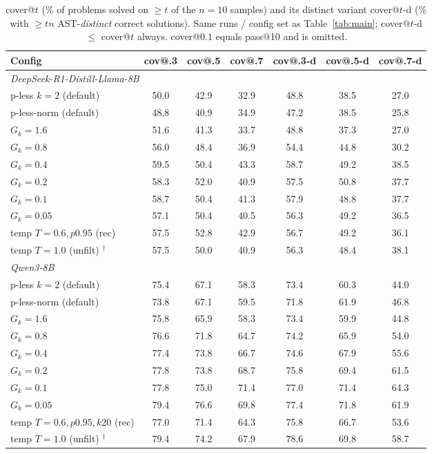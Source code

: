 \documentclass[11pt]{article}                       %
\begin{document}
\begin{table}[H]\centering\small
\caption{cover@$t$ (\% of problems solved on $\ge t$ of the $n{=}10$ samples) and its distinct variant
cover@$t$-d (\% with $\ge tn$ AST-\emph{distinct} correct solutions). Same runs / config set as
Table~\ref{tab:main}; cover@$t$-d $\le$ cover@$t$ always. cover@$0.1$ equals pass@10 and is omitted.}
\label{tab:cover}
\begin{tabular}{lcccccc}
\toprule
Config & cov@.3 & cov@.5 & cov@.7 & cov@.3-d & cov@.5-d & cov@.7-d \\
\midrule
\multicolumn{7}{l}{\textit{DeepSeek-R1-Distill-Llama-8B}}\\
p-less $k{=}2$ (default) & 50.0 & 42.9 & 32.9 & 48.8 & 38.5 & 27.0 \\
p-less-norm (default) & 48.8 & 40.9 & 34.9 & 47.2 & 38.5 & 25.8 \\
$G_k{=}1.6$ & 51.6 & 41.3 & 33.7 & 48.8 & 37.3 & 27.0 \\
$G_k{=}0.8$ & 56.0 & 48.4 & 36.9 & 54.4 & 44.8 & 30.2 \\
$G_k{=}0.4$ & 59.5 & 50.4 & 43.3 & 58.7 & 49.2 & 38.5 \\
$G_k{=}0.2$ & 58.3 & 52.0 & 40.9 & 57.5 & 50.8 & 37.7 \\
$G_k{=}0.1$ & 58.7 & 50.4 & 41.3 & 57.9 & 48.8 & 37.7 \\
$G_k{=}0.05$ & 57.1 & 50.4 & 40.5 & 56.3 & 49.2 & 36.5 \\
temp $T{=}0.6,p0.95$ (rec) & 57.5 & 52.8 & 42.9 & 56.7 & 49.2 & 36.1 \\
temp $T{=}1.0$ (unfilt) $^\dagger$ & 57.5 & 50.0 & 40.9 & 56.3 & 48.4 & 38.1 \\
\midrule
\multicolumn{7}{l}{\textit{Qwen3-8B}}\\
p-less $k{=}2$ (default) & 75.4 & 67.1 & 58.3 & 73.4 & 60.3 & 44.0 \\
p-less-norm (default) & 73.8 & 67.1 & 59.5 & 71.8 & 61.9 & 46.8 \\
$G_k{=}1.6$ & 75.8 & 65.9 & 58.3 & 73.4 & 59.9 & 44.8 \\
$G_k{=}0.8$ & 76.6 & 71.8 & 64.7 & 74.2 & 65.9 & 54.0 \\
$G_k{=}0.4$ & 77.4 & 73.8 & 66.7 & 74.6 & 67.9 & 55.6 \\
$G_k{=}0.2$ & 77.8 & 73.8 & 68.7 & 75.8 & 69.4 & 61.5 \\
$G_k{=}0.1$ & 77.8 & 75.0 & 71.4 & 77.0 & 71.4 & 64.3 \\
$G_k{=}0.05$ & 79.4 & 76.6 & 69.8 & 77.4 & 71.8 & 61.9 \\
temp $T{=}0.6,p0.95,k20$ (rec) & 77.0 & 71.4 & 64.3 & 75.8 & 66.7 & 53.6 \\
temp $T{=}1.0$ (unfilt) $^\dagger$ & 79.4 & 74.2 & 67.9 & 78.6 & 69.8 & 58.7 \\
\bottomrule
\end{tabular}
\end{table}
\end{document}
